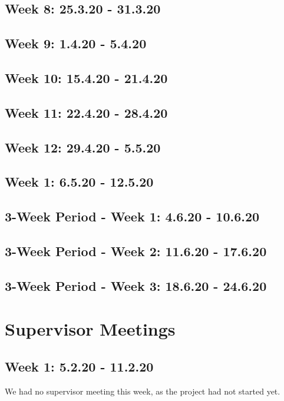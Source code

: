 \documentclass[11pt, fleqn]{article}
\begin{document}
\subsection*{Week 8: 25.3.20 - 31.3.20}


\subsection*{Week 9: 1.4.20 - 5.4.20}


\subsection*{Week 10: 15.4.20 - 21.4.20}


\subsection*{Week 11: 22.4.20 - 28.4.20}


\subsection*{Week 12: 29.4.20 - 5.5.20}


\subsection*{Week 1: 6.5.20 - 12.5.20}


\subsection*{3-Week Period - Week 1: 4.6.20 - 10.6.20}


\subsection*{3-Week Period - Week 2: 11.6.20 - 17.6.20}


\subsection*{3-Week Period - Week 3: 18.6.20 - 24.6.20}



\section*{Supervisor Meetings}

\subsection*{Week 1: 5.2.20 - 11.2.20}
We had no supervisor meeting this week, as the project had not started yet.
\end{document}
